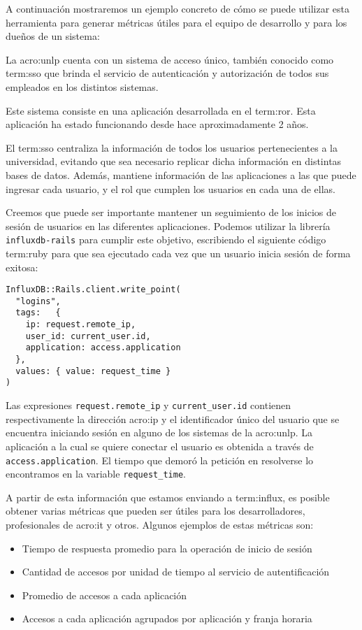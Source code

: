 A continuación mostraremos un ejemplo concreto de cómo se puede utilizar esta
herramienta para generar métricas útiles para el equipo de desarrollo y para
los dueños de un sistema:

La \gls{acro:unlp} cuenta con un sistema de acceso único, también conocido como
\gls{term:sso} que brinda el servicio de autenticación y autorización de todos
sus empleados en los distintos sistemas.

Este sistema consiste en una aplicación desarrollada en el 
\gls{term:ror}. Esta aplicación ha estado funcionando desde hace
aproximadamente 2 años.

El \gls{term:sso} centraliza la información de todos los usuarios
pertenecientes a la universidad, evitando que sea necesario replicar dicha
información en distintas bases de datos. Además, mantiene información de las
aplicaciones a las que puede ingresar cada usuario, y el rol que cumplen los
usuarios en cada una de ellas.

Creemos que puede ser importante mantener un seguimiento de los inicios de
sesión de usuarios en las diferentes aplicaciones. Podemos utilizar la librería
\texttt{influxdb-rails} para cumplir este objetivo, escribiendo el siguiente
código \gls{term:ruby} para que sea ejecutado cada vez que un usuario inicia
sesión de forma exitosa:

\begin{lstlisting}
InfluxDB::Rails.client.write_point(
  "logins",
  tags:   { 
    ip: request.remote_ip,
    user_id: current_user.id,
    application: access.application
  },
  values: { value: request_time }
)
\end{lstlisting}

Las expresiones \lstinline{request.remote_ip} y \lstinline{current_user.id}
contienen respectivamente la dirección \gls{acro:ip} y el identificador único
del usuario que se encuentra iniciando sesión en alguno de los sistemas de la
\gls{acro:unlp}. La aplicación a la cual se quiere conectar el usuario es
obtenida a través de \lstinline{access.application}. El tiempo que demoró la
petición  en resolverse lo encontramos en la variable
\lstinline{request_time}.

A partir de esta información que estamos enviando a \gls{term:influx}, es
posible obtener varias métricas que pueden ser útiles para los desarrolladores,
profesionales de \gls{acro:it} y otros. Algunos ejemplos de estas métricas son:

\begin{itemize}
  \item Tiempo de respuesta promedio para la operación de inicio de sesión
  \item Cantidad de accesos por unidad de tiempo al servicio de autentificación
  \item Promedio de accesos a cada aplicación
  \item Accesos a cada aplicación agrupados por aplicación y franja horaria
\end{itemize}

